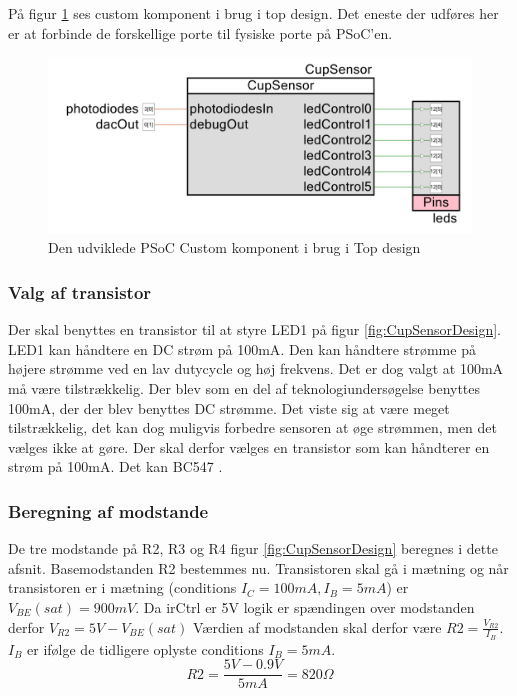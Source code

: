 \documentclass[HardwareDesign/HardwareDesign_main.tex]{subfiles}
\begin{document}
På figur \ref{fig:CupSensorComponentInTopDesign} ses custom komponent i brug i top design. Det eneste der udføres her er at forbinde de forskellige porte til fysiske porte på PSoC'en.   
\begin{figure}[H]
    \centering
    \includegraphics[width=1\textwidth]{HardwareDesign/CupSensor/graphics/FinalDesign/ComponentInTopDesign.PNG}
    \caption{Den udviklede PSoC Custom komponent i brug i Top design}
    \label{fig:CupSensorComponentInTopDesign}
\end{figure}

\subsubsection{Valg af transistor}
Der skal benyttes en transistor til at styre LED1 på figur \ref{fig:CupSensorDesign}. LED1 kan håndtere en DC strøm på 100mA\autocite[7]{SFH485}. Den kan håndtere strømme på højere strømme ved en lav dutycycle og høj frekvens. Det er dog valgt at 100mA må være tilstrækkelig. Der blev som en del af teknologiundersøgelse benyttes 100mA, der der blev benyttes DC strømme. Det viste sig at være meget tilstrækkelig, det kan dog muligvis forbedre sensoren at øge strømmen, men det vælges ikke at gøre. 
Der skal derfor vælges en transistor som kan håndterer en strøm på 100mA. Det kan BC547 \autocite[2]{BC547}.

\subsubsection{Beregning af modstande}
De tre modstande på R2, R3 og R4 figur \ref{fig:CupSensorDesign} beregnes i dette afsnit. Basemodstanden R2 bestemmes nu. Transistoren skal gå i mætning og når transistoren er i mætning (conditions $I_C = 100\si{mA}, I_B = 5\si{mA}$) er $V_{BE}(sat)=900mV$\autocite[2]{BC547}. Da irCtrl er 5V logik er spændingen over modstanden derfor $V_{R2} = 5\si{V}-V_{BE}(sat)$
Værdien af modstanden skal derfor være $R2 = \frac{V_{R2}}{I_B}$. $I_B$ er ifølge de tidligere oplyste conditions $I_B = 5\si{mA}$.
$$R2=\frac{5\si{V} - 0.9\si{V}}{5\si{mA}} = 820\si{\Omega}$$
\end{document}
